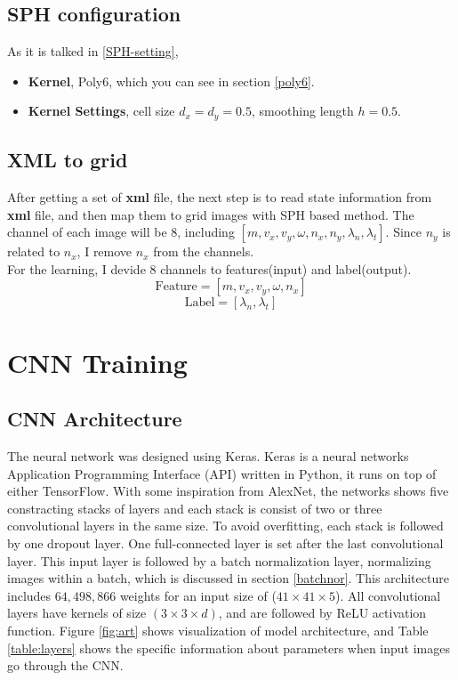 \subsection{SPH configuration}
As it is talked in \ref{SPH-setting}, 
\begin{itemize}
    \item \textbf{Kernel}, Poly6, which you can see in section \ref{poly6}.
    \item \textbf{Kernel Settings}, cell size $d_x=d_y=0.5$, smoothing length $h=0.5$.
\end{itemize}
\subsection{XML to grid}
After getting a set of \textbf{xml} file, the next step is to read state information from \textbf{xml} file, and then map them to grid images with SPH based method. The channel of each image will be 8, including $[m, v_x, v_y, \omega, n_x, n_y, \lambda_n, \lambda_t]$. Since $n_y$ is related to $n_x$, I remove $n_x$ from the channels. \\

For the learning, I devide 8 channels to features(input) and label(output).
    $$\text{Feature} = [m, v_x, v_y, \omega, n_x]$$
    $$\text{Label} = [\lambda_n, \lambda_t]$$



\section{CNN Training}
\subsection{CNN  Architecture}
    The neural network was designed using Keras\cite{chollet2015keras}. Keras is a neural networks Application Programming Interface (API) written in Python, it runs on top of either TensorFlow. With some inspiration from AlexNet\cite{Krizhevsky:2012:ICD:2999134.2999257}, the networks shows five constracting stacks of layers and each stack is consist of two or three convolutional layers in the same size. To avoid overfitting, each stack is followed by one dropout layer. One full-connected layer is set after the last convolutional layer. This input layer is followed by a batch normalization layer, normalizing images within a batch, which is discussed in section \ref{batchnor}. This architecture includes $64,498,866$ weights for an input size of ($41\times41\times5$). All convolutional layers have kernels of size $(3\times 3\times d)$, and are followed by ReLU activation function. Figure \ref{fig:art} shows visualization of model architecture, and Table \ref{table:layers} shows the specific information about parameters when input images go through the CNN.

